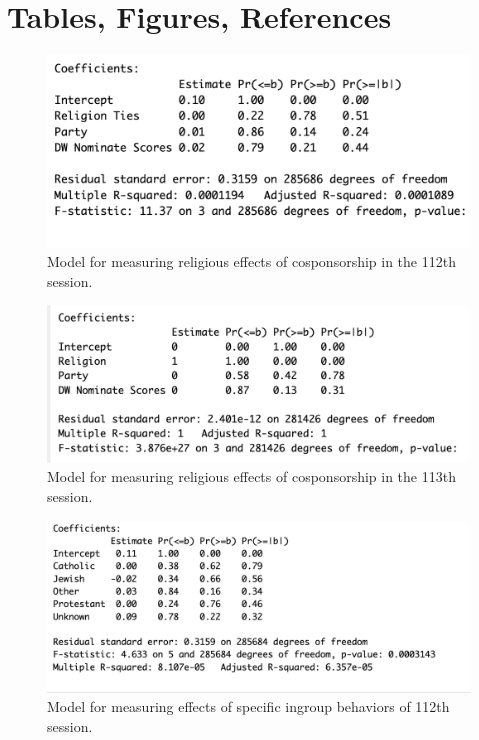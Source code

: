 \documentclass[Royal,times,sageh]{sagej}
\begin{document}
\hypertarget{tables-figures-references}{%
\section{Tables, Figures, References}\label{tables-figures-references}}

\begin{figure}

{\centering \includegraphics[width=0.7\linewidth]{images/112th_religion_firstmodel} 

}

\caption{Model for measuring religious effects of cosponsorship in the 112th session.\label{table1}}\label{fig:table1}
\end{figure}

\begin{figure}

{\centering \includegraphics[width=0.7\linewidth]{images/117th_religion_firstmodel} 

}

\caption{Model for measuring religious effects of cosponsorship in the 113th session. \label{table2}}\label{fig:table2}
\end{figure}

\begin{figure}

{\centering \includegraphics[width=0.7\linewidth]{images/112th_religion} 

}

\caption{Model for measuring effects of specific ingroup behaviors of 112th session. \label{table3}}\label{fig:table3}
\end{figure}
\end{document}
